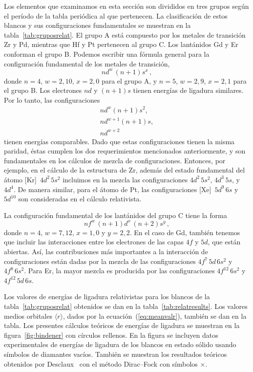 Los elementos que examinamos en esta sección son divididos en tres 
grupos según el período de la tabla periódica al que pertenecen. La 
clasificación de estos blancos y sus configuraciones fundamentales se
muestran en la tabla~\ref{tab:gruposrelat}. El grupo A está compuesto 
por los metales de transición Zr y Pd, mientras que Hf y Pt pertenecen 
al grupo C. Los lantánidos Gd y Er conforman el grupo B. 
Podemos escribir una fórmula general para la configuración fundamental 
de los metales de transición, 
\begin{equation}
nd^w\,(n+1)s^x\,,
\end{equation}
donde $n=4$, $w=2,10$, $x=2,0$ para el grupo A, y $n=5$, $w=2,9$, 
$x=2,1$ para el grupo B. Los electrones $nd$ y $(n+1)s$ tienen energías 
de ligadura similares. Por lo tanto, las configuraciones 
\begin{gather}
nd^w(n+1)s^2, \\
nd^{w+1}(n+1)s, \\
nd^{w+2}
\end{gather}
tienen energías comparables. Dado que estas configuraciones tienen la 
misma paridad, éstas cumplen los dos requerimientos mencionados 
anteriormente, y son fundamentales en los cálculos de mezcla de 
configuraciones. Entonces, por ejemplo, en el cálculo de la estructura 
de Zr, además del estado fundamental del átomo [Kr]~$4d^2\,5s^2$ 
incluimos en la mezcla las configuraciones $4d^2\,5s^2$, $4d^3\,5s$, y 
$4d^4$. De manera similar, para el átomo de Pt, las configuraciones
[Xe]~$5d^9\,6s$ y $5d^{10}$ son consideradas en el cálculo relativista.

La configuración fundamental de los lantánidos del grupo C tiene la 
forma 
\begin{equation}
nf^w\,(n+1)d^x\,(n+2)s^y\,,
\end{equation}
donde $n=4$, $w=7,12$, $x=1,0$ y $y=2,2$. En el caso de Gd, también 
tenemos que incluir las interacciones entre los electrones de las capas
$4f$ y $5d$, que están abiertas. Así, las contribuciones más 
importantes a la interacción de configuraciones están dadas por la 
mezcla de las configuraciones $4f^7\,5d\,6s^2$ y $4f^8\,6s^2$.
Para Er, la mayor mezcla es producida por las configuraciones 
$4f^{12}\,6s^2$ y $4f^{12}\,5d\,6s$.

Los valores de energías de ligadura relativistas para los blancos de la 
tabla~\ref{tab:gruposrelat} obtenidos se dan en la 
tabla~\ref{tab:relatresults}. Los valores medios orbitales 
$\langle r \rangle$, dados por la ecuación~(\ref{eq:meanvalr}), también 
se dan en la tabla. Los presentes cálculos teóricos de energías de 
ligadura se muestran en la figura~\ref{fig:bindener} con círculos
rellenos. En la figura se incluyen datos experimentales de energías de 
ligadura de los blancos en estado sólido usando símbolos de diamantes 
vacíos. También se muestran los resultados teóricos obtenidos por 
Desclaux~\cite{Desclaux:73} con el método Dirac--Fock con símbolos 
$\times$.

